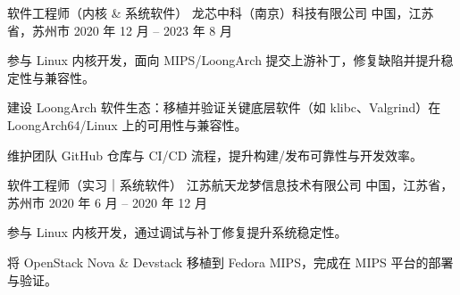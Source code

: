 

\begin{cventries}

  \cventry
    {软件工程师（内核 \& 系统软件）} %
    {龙芯中科（南京）科技有限公司} %
    {中国，江苏省，苏州市} %
    {2020 年 12 月 -- 2023 年 8 月} %
    {
      \begin{cvitems}
        \item {参与 Linux 内核开发，面向 MIPS/LoongArch 提交上游补丁，修复缺陷并提升稳定性与兼容性。}
        \item {建设 LoongArch 软件生态：移植并验证关键底层软件（如 klibc、Valgrind）在 LoongArch64/Linux 上的可用性与兼容性。}
        \item {维护团队 GitHub 仓库与 CI/CD 流程，提升构建/发布可靠性与开发效率。}
      \end{cvitems}
    }

  \cventry
    {软件工程师（实习｜系统软件）} %
    {江苏航天龙梦信息技术有限公司} %
    {中国，江苏省，苏州市} %
    {2020 年 6 月 -- 2020 年 12 月} %
    {
      \begin{cvitems}
        \item {参与 Linux 内核开发，通过调试与补丁修复提升系统稳定性。}
        \item {将 OpenStack Nova \& Devstack 移植到 Fedora MIPS，完成在 MIPS 平台的部署与验证。}
      \end{cvitems}
    }

\end{cventries}
